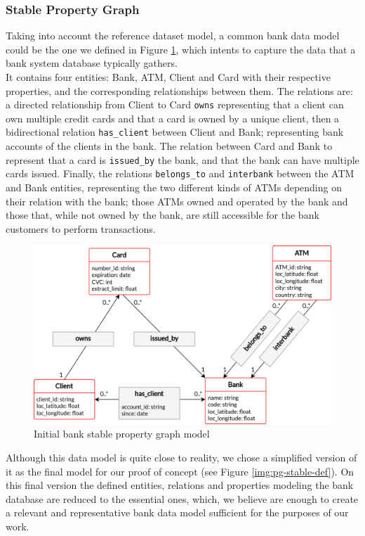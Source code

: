 \subsubsection{Stable Property Graph}\label{section:stable-pg}

Taking into account the reference dataset model, a common bank data model could be the one we defined in Figure \ref{img:pg-stable-big}, which intents to capture the data that a bank system database typically gathers.\\
It contains four entities: Bank, ATM, Client and Card with their respective properties, and the corresponding relationships between them. The relations are: a directed relationship from Client to Card \texttt{owns} representing that a client can own multiple credit cards and that a card is owned by a unique client, then a bidirectional relation \texttt{has\_client} between Client and Bank; representing bank accounts of the clients in the bank. The relation between Card and Bank to represent that a card is \texttt{issued\_by} the bank, and that the bank can have multiple cards issued. Finally, the relations \texttt{belongs\_to} and \texttt{interbank} between the ATM and Bank entities, representing the two different kinds of ATMs depending on their relation with the bank; those ATMs owned and operated by the bank and those that, while not owned by the bank, are still accessible for the bank customers to perform transactions.

\begin{figure}[h]
  \centering
  \includegraphics[scale = 0.7]{images/1-DataModel/PG-stable-edit-cardinal.png}
  \caption{Initial bank stable property graph model}
  \label{img:pg-stable-big}
\end{figure}

Although this data model is quite close to reality, we chose a simplified version of it as the final model for our proof of concept (see Figure \ref{img:pg-stable-def}). On this final version the defined entities, relations and properties modeling the bank database are reduced to the essential ones, which, we believe are enough to create a relevant and representative bank data model sufficient for the purposes of our work.

